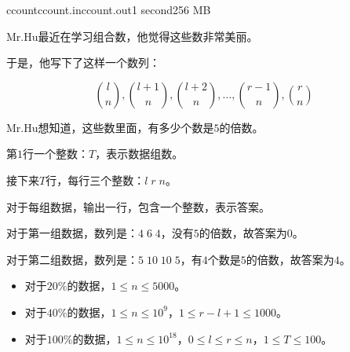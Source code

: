 \documentclass[11pt,a4paper,oneside]{article}
\begin{document}
\begin{problem}{ccount}{ccount.in}{ccount.out}{1 second}{256 MB}	
	
	Mr.Hu最近在学习组合数，他觉得这些数非常美丽。
	
	于是，他写下了这样一个数列：
	
	$$
		\binom{l}{n}, \binom{l+1}{n}, \binom{l+2}{n}, \dots, \binom{r-1}{n}, \binom{r}{n}
	$$
	
	Mr.Hu想知道，这些数里面，有多少个数是$5$的倍数。
	
	\InputFile
	
	第$1$行一个整数：$T$，表示数据组数。
	
	接下来$T$行，每行三个整数：$l \; r \; n$。
	
	\OutputFile
	
	对于每组数据，输出一行，包含一个整数，表示答案。
	
	\Example
	
	\begin{example}
	\end{example}
	
	对于第一组数据，数列是：$4 \; 6 \; 4$，没有$5$的倍数，故答案为$0$。
	
	对于第二组数据，数列是：$5 \; 10 \; 10 \; 5$，有$4$个数是$5$的倍数，故答案为$4$。
	
	\Note
	
	\begin{itemize}
		\item 对于$20\%$的数据，$1 \leq n \leq 5000$。
		\item 对于$40\%$的数据，$1 \leq n \leq 10^9$，$1 \leq r - l + 1 \leq 1000$。
		\item 对于$100\%$的数据，$1 \leq n \leq 10^{18}$，$0 \leq l \leq r \leq n$，$1 \leq T \leq 100$。
	\end{itemize}

\end{problem}
\end{document}
